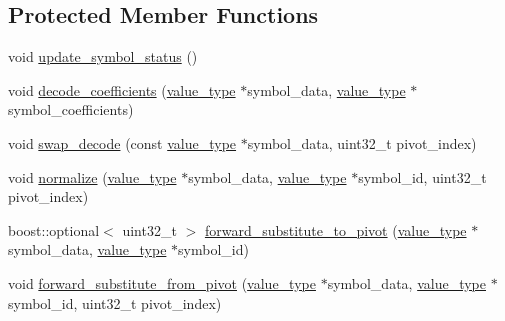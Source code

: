 \subsection*{Protected Member Functions}
\begin{DoxyCompactItemize}
\item 
void \hyperlink{classkodo_1_1bidirectional__linear__block__decoder_a1136841972e668b2af5973857f930724}{update\-\_\-symbol\-\_\-status} ()
\item 
void \hyperlink{classkodo_1_1bidirectional__linear__block__decoder_a61781e3b124f1b4d60091ce00272c420}{decode\-\_\-coefficients} (\hyperlink{classkodo_1_1bidirectional__linear__block__decoder_a2039f4bd553ca7826a233080a7ecb230}{value\-\_\-type} $\ast$symbol\-\_\-data, \hyperlink{classkodo_1_1bidirectional__linear__block__decoder_a2039f4bd553ca7826a233080a7ecb230}{value\-\_\-type} $\ast$symbol\-\_\-coefficients)
\item 
void \hyperlink{classkodo_1_1bidirectional__linear__block__decoder_ac7426942ceb6184f67c62ca523dda27f}{swap\-\_\-decode} (const \hyperlink{classkodo_1_1bidirectional__linear__block__decoder_a2039f4bd553ca7826a233080a7ecb230}{value\-\_\-type} $\ast$symbol\-\_\-data, uint32\-\_\-t pivot\-\_\-index)
\item 
void \hyperlink{classkodo_1_1bidirectional__linear__block__decoder_a519dc918330684a40ec896ac823408d5}{normalize} (\hyperlink{classkodo_1_1bidirectional__linear__block__decoder_a2039f4bd553ca7826a233080a7ecb230}{value\-\_\-type} $\ast$symbol\-\_\-data, \hyperlink{classkodo_1_1bidirectional__linear__block__decoder_a2039f4bd553ca7826a233080a7ecb230}{value\-\_\-type} $\ast$symbol\-\_\-id, uint32\-\_\-t pivot\-\_\-index)
\item 
boost\-::optional$<$ uint32\-\_\-t $>$ \hyperlink{classkodo_1_1bidirectional__linear__block__decoder_a80234f02f999195a2b8a8e01533e9cf4}{forward\-\_\-substitute\-\_\-to\-\_\-pivot} (\hyperlink{classkodo_1_1bidirectional__linear__block__decoder_a2039f4bd553ca7826a233080a7ecb230}{value\-\_\-type} $\ast$symbol\-\_\-data, \hyperlink{classkodo_1_1bidirectional__linear__block__decoder_a2039f4bd553ca7826a233080a7ecb230}{value\-\_\-type} $\ast$symbol\-\_\-id)
\item 
void \hyperlink{classkodo_1_1bidirectional__linear__block__decoder_a7775e64a99e8aede7c383f2d410fa1d0}{forward\-\_\-substitute\-\_\-from\-\_\-pivot} (\hyperlink{classkodo_1_1bidirectional__linear__block__decoder_a2039f4bd553ca7826a233080a7ecb230}{value\-\_\-type} $\ast$symbol\-\_\-data, \hyperlink{classkodo_1_1bidirectional__linear__block__decoder_a2039f4bd553ca7826a233080a7ecb230}{value\-\_\-type} $\ast$symbol\-\_\-id, uint32\-\_\-t pivot\-\_\-index)

\end{DoxyCompactItemize}
